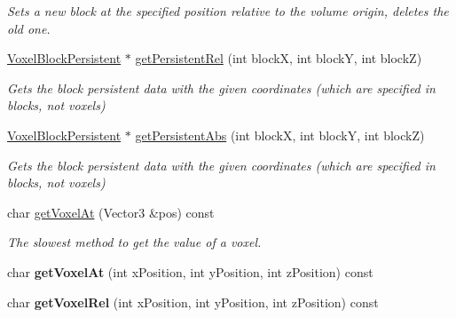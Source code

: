 \begin{DoxyCompactItemize}
\begin{DoxyCompactList}\small\item\em \-Sets a new block at the specified position relative to the volume origin, deletes the old one. \end{DoxyCompactList}\item 
\hypertarget{classVoxelVolume_a4a93b4f89d668d5c52d22f7da1d86d61}{
\hyperlink{classVoxelBlockPersistent}{\-Voxel\-Block\-Persistent} $\ast$ \hyperlink{classVoxelVolume_a4a93b4f89d668d5c52d22f7da1d86d61}{get\-Persistent\-Rel} (int block\-X, int block\-Y, int block\-Z)}
\label{d0/d1c/classVoxelVolume_a4a93b4f89d668d5c52d22f7da1d86d61}

\begin{DoxyCompactList}\small\item\em \-Gets the block persistent data with the given coordinates (which are specified in blocks, not voxels) \end{DoxyCompactList}\item 
\hypertarget{classVoxelVolume_a837a06d51bb9c35fb7c87fd25284dfc1}{
\hyperlink{classVoxelBlockPersistent}{\-Voxel\-Block\-Persistent} $\ast$ \hyperlink{classVoxelVolume_a837a06d51bb9c35fb7c87fd25284dfc1}{get\-Persistent\-Abs} (int block\-X, int block\-Y, int block\-Z)}
\label{d0/d1c/classVoxelVolume_a837a06d51bb9c35fb7c87fd25284dfc1}

\begin{DoxyCompactList}\small\item\em \-Gets the block persistent data with the given coordinates (which are specified in blocks, not voxels) \end{DoxyCompactList}\item 
\hypertarget{classVoxelVolume_aee09dbed36004ff9f4f8285ce4a48e4a}{
char \hyperlink{classVoxelVolume_aee09dbed36004ff9f4f8285ce4a48e4a}{get\-Voxel\-At} (\-Vector3 \&pos) const }
\label{d0/d1c/classVoxelVolume_aee09dbed36004ff9f4f8285ce4a48e4a}

\begin{DoxyCompactList}\small\item\em \-The slowest method to get the value of a voxel. \end{DoxyCompactList}\item 
\hypertarget{classVoxelVolume_a7f92e1f1ea1df081f1b302f252cfdb1c}{
char {\bfseries get\-Voxel\-At} (int x\-Position, int y\-Position, int z\-Position) const }
\label{d0/d1c/classVoxelVolume_a7f92e1f1ea1df081f1b302f252cfdb1c}

\item 
\hypertarget{classVoxelVolume_a130dd6f7596d43281276960e075d9d36}{
char {\bfseries get\-Voxel\-Rel} (int x\-Position, int y\-Position, int z\-Position) const }
\label{d0/d1c/classVoxelVolume_a130dd6f7596d43281276960e075d9d36}


\end{DoxyCompactItemize}
